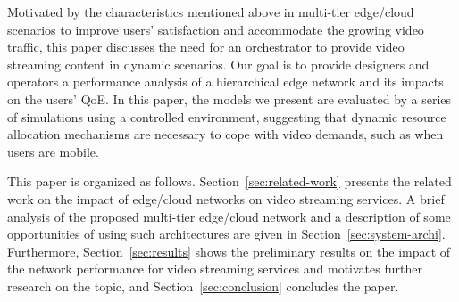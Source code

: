 
Motivated by the characteristics mentioned above in multi-tier edge/cloud scenarios to improve users' satisfaction and accommodate the growing video traffic, this paper discusses the need for an orchestrator to provide video streaming content in dynamic scenarios.
Our goal is to provide designers and operators a performance analysis of a hierarchical edge network and its impacts on the users' QoE. In this paper, the models we present are evaluated by a series of simulations using a controlled environment, suggesting that dynamic resource allocation mechanisms are necessary to cope with video demands, such as when users are mobile.

This paper is organized as follows.
Section~\ref{sec:related-work} presents the related work on the impact of edge/cloud networks on video streaming services.
A brief analysis of the proposed multi-tier edge/cloud network and a description of some opportunities of using such architectures are given in Section~\ref{sec:system-archi}.
Furthermore, Section~\ref{sec:results} shows the preliminary results on the impact of the network performance for video streaming services and motivates further research on the topic, and Section~\ref{sec:conclusion} concludes the paper.
